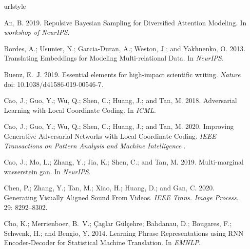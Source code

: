 \documentclass[letterpaper]{article}
\begin{document}
\begin{thebibliography}{43}
\providecommand{\natexlab}[1]{#1}
\providecommand{\url}[1]{\texttt{#1}}
\providecommand{\urlprefix}{URL }
\expandafter\ifx\csname urlstyle\endcsname\relax
  \providecommand{\doi}[1]{doi:\discretionary{}{}{}#1}\else
  \providecommand{\doi}{doi:\discretionary{}{}{}\begingroup
  \urlstyle{rm}\Url}\fi

An, B. 2019.
\newblock Repulsive Bayesian Sampling for Diversified Attention Modeling.
\newblock In \emph{workshop of NeurIPS}.

Bordes, A.; Usunier, N.; Garcia-Duran, A.; Weston, J.; and Yakhnenko, O. 2013.
\newblock Translating Embeddings for Modeling Multi-relational Data.
\newblock In \emph{NeurIPS}.

Buenz, E.~J. 2019.
\newblock Essential elements for high-impact scientific writing.
\newblock \emph{Nature} doi: 10.1038/d41586-019-00546-7.

Cao, J.; Guo, Y.; Wu, Q.; Shen, C.; Huang, J.; and Tan, M. 2018.
\newblock Adversarial Learning with Local Coordinate Coding.
\newblock In \emph{ICML}.

Cao, J.; Guo, Y.; Wu, Q.; Shen, C.; Huang, J.; and Tan, M. 2020.
\newblock Improving Generative Adversarial Networks with Local Coordinate
  Coding.
\newblock \emph{IEEE Transactions on Pattern Analysis and Machine Intelligence}
  .

Cao, J.; Mo, L.; Zhang, Y.; Jia, K.; Shen, C.; and Tan, M. 2019.
\newblock Multi-marginal wasserstein gan.
\newblock In \emph{NeurIPS}.

Chen, P.; Zhang, Y.; Tan, M.; Xiao, H.; Huang, D.; and Gan, C. 2020.
\newblock Generating Visually Aligned Sound From Videos.
\newblock \emph{{IEEE} Trans. Image Process.} 29: 8292--8302.

Cho, K.; Merrienboer, B.~V.; Çaglar G{\"u}lçehre; Bahdanau, D.; Bougares, F.;
  Schwenk, H.; and Bengio, Y. 2014.
\newblock Learning Phrase Representations using RNN Encoder-Decoder for
  Statistical Machine Translation.
\newblock In \emph{EMNLP}.


\end{thebibliography}
\end{document}
